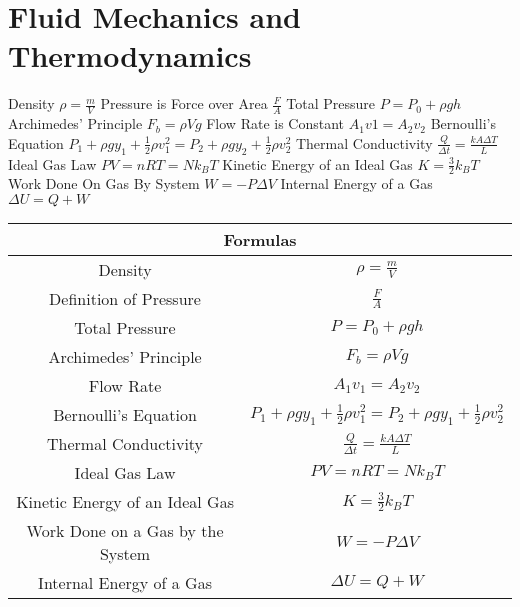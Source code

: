 \documentclass[11pt]{article}
\begin{document}
    \section{Fluid Mechanics and Thermodynamics}
    Density $\rho = \frac{m}{V}$\newline
    Pressure is Force over Area $\frac{F}{A}$\newline
    Total Pressure $P = P_{0} + \rho gh$\newline
    Archimedes' Principle $F_{b} = \rho Vg$\newline
    Flow Rate is Constant $A_{1}v{1} = A_{2}v_{2}$\newline
    Bernoulli's Equation $P_{1} + \rho gy_{1} + \frac{1}{2}\rho v_{1}^{2} = P_{2} + \rho gy_{2} + \frac{1}{2}\rho v_{2}^{2}$\newline
    Thermal Conductivity $\frac{Q}{\Delta t} = \frac{kA\Delta T}{L}$\newline
    Ideal Gas Law $PV=nRT=Nk_{B}T$\newline
    Kinetic Energy of an Ideal Gas $K = \frac{3}{2}k_{B}T$\newline
    Work Done On Gas By System $W = -P\Delta V$\newline
    Internal Energy of a Gas $\Delta U = Q + W$\newline \newline
    \begin{tabular}{|c|c|}
        \hline
        \multicolumn{2}{|c|}{Formulas}\\
        \hline
        Density & $\rho = \frac{m}{V}$\\
        \hline
        Definition of Pressure & $\frac{F}{A}$\\
        \hline
        Total Pressure & $P = P_{0} + \rho gh$\\
        \hline
        Archimedes' Principle & $F_{b} = \rho Vg$\\
        \hline
        Flow Rate & $A_{1}v_{1}=A_{2}v_{2}$\\
        \hline
        Bernoulli's Equation & $P_{1} + \rho gy_{1} + \frac{1}{2}\rho v_{1}^{2} = P_{2} + \rho gy_{1} + \frac{1}{2}\rho v_{2}^{2}$\\
        \hline
        Thermal Conductivity & $\frac{Q}{\Delta t} = \frac{kA\Delta T}{L}$\\
        \hline
        Ideal Gas Law & $PV=nRT=Nk_{B}T$\\
        \hline
        Kinetic Energy of an Ideal Gas & $K = \frac{3}{2}k_{B}T$\\
        \hline
        Work Done on a Gas by the System & $W = -P\Delta V$\\
        \hline
        Internal Energy of a Gas & $\Delta U = Q + W$\\
        \hline
    \end{tabular}
    
\end{document}
